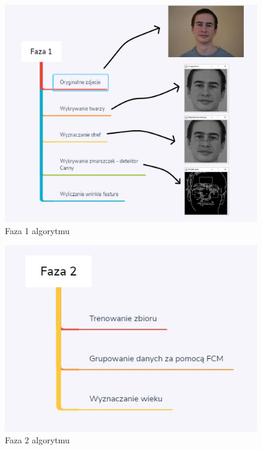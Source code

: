 \documentclass[a4paper,twoside,12pt]{book}
\begin{document}
    \begin{figure}
        \centering
        \includegraphics[width=11cm]{Obrazy/Faza1.jpg}
        \caption{Faza 1 algorytmu}
        \label{fig.faza1Algorytmu}
    \end{figure}

    \begin{figure}
        \centering
        \includegraphics[width=11cm]{Obrazy/Faza2.jpg}
        \caption{Faza 2 algorytmu}
        \label{fig.faza2Algorytmu}
    \end{figure}
\end{document}
